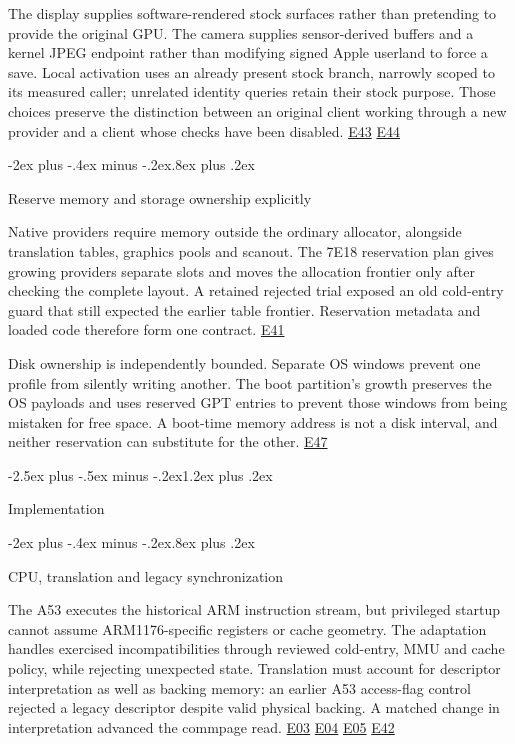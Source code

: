 \documentclass[10pt,letterpaper,twocolumn]{article}
\makeatletter
\renewcommand{\section}{\@startsection{section}{1}{0pt}
  {-2.5ex plus -.5ex minus -.2ex}{1.2ex plus .2ex}
  {\normalfont\large\bfseries\raggedright}}
\renewcommand{\subsection}{\@startsection{subsection}{2}{0pt}
  {-2ex plus -.4ex minus -.2ex}{.8ex plus .2ex}
  {\normalfont\normalsize\bfseries\raggedright}}
\makeatother
\begin{document}
The display supplies software-rendered stock surfaces rather than pretending to provide the original GPU. The camera supplies sensor-derived buffers and a kernel JPEG endpoint rather than modifying signed Apple userland to force a save. Local activation uses an already present stock branch, narrowly scoped to its measured caller; unrelated identity queries retain their stock purpose. Those choices preserve the distinction between an original client working through a new provider and a client whose checks have been disabled. \hyperlink{e-E43}{\textsf{E43}} \hyperlink{e-E44}{\textsf{E44}}

\subsection{Reserve memory and storage ownership explicitly}

Native providers require memory outside the ordinary allocator, alongside translation tables, graphics pools and scanout. The 7E18 reservation plan gives growing providers separate slots and moves the allocation frontier only after checking the complete layout. A retained rejected trial exposed an old cold-entry guard that still expected the earlier table frontier. Reservation metadata and loaded code therefore form one contract. \hyperlink{e-E41}{\textsf{E41}}

Disk ownership is independently bounded. Separate OS windows prevent one profile from silently writing another. The boot partition's growth preserves the OS payloads and uses reserved GPT entries to prevent those windows from being mistaken for free space. A boot-time memory address is not a disk interval, and neither reservation can substitute for the other. \hyperlink{e-E47}{\textsf{E47}}

\section{Implementation}

\subsection{CPU, translation and legacy synchronization}

The A53 executes the historical ARM instruction stream, but privileged startup cannot assume ARM1176-specific registers or cache geometry. The adaptation handles exercised incompatibilities through reviewed cold-entry, MMU and cache policy, while rejecting unexpected state. Translation must account for descriptor interpretation as well as backing memory: an earlier A53 access-flag control rejected a legacy descriptor despite valid physical backing. A matched change in interpretation advanced the commpage read. \hyperlink{e-E03}{\textsf{E03}} \hyperlink{e-E04}{\textsf{E04}} \hyperlink{e-E05}{\textsf{E05}} \hyperlink{e-E42}{\textsf{E42}}
\end{document}
